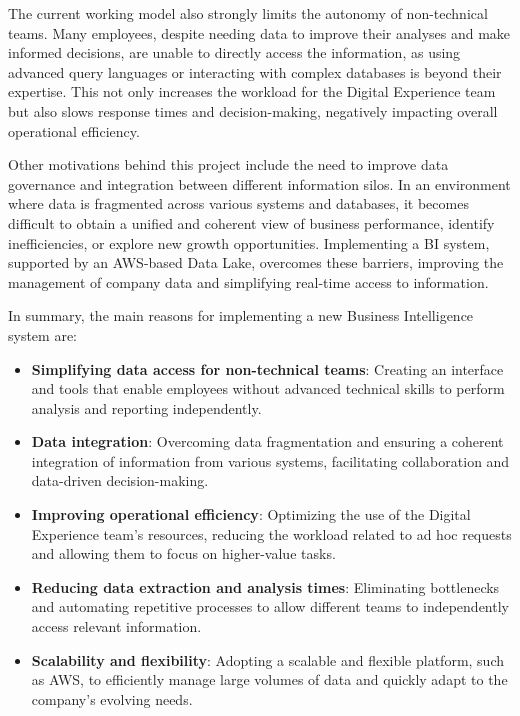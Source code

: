 The current working model also strongly limits the autonomy of non-technical teams. Many employees, despite needing data to improve their analyses and make informed decisions, are unable to directly access the information, as using advanced query languages or interacting with complex databases is beyond their expertise. This not only increases the workload for the Digital Experience team but also slows response times and decision-making, negatively impacting overall operational efficiency.

Other motivations behind this project include the need to improve data governance and integration between different information silos. In an environment where data is fragmented across various systems and databases, it becomes difficult to obtain a unified and coherent view of business performance, identify inefficiencies, or explore new growth opportunities. Implementing a \ac{BI} system, supported by an \ac{AWS}-based Data Lake, overcomes these barriers, improving the management of company data and simplifying real-time access to information.

In summary, the main reasons for implementing a new Business Intelligence system are:

\begin{itemize}
    \item \textbf{Simplifying data access for non-technical teams}: Creating an interface and tools that enable employees without advanced technical skills to perform analysis and reporting independently.
    \item \textbf{Data integration}: Overcoming data fragmentation and ensuring a coherent integration of information from various systems, facilitating collaboration and data-driven decision-making.
    \item \textbf{Improving operational efficiency}: Optimizing the use of the Digital Experience team's resources, reducing the workload related to ad hoc requests and allowing them to focus on higher-value tasks.
    \item \textbf{Reducing data extraction and analysis times}: Eliminating bottlenecks and automating repetitive processes to allow different teams to independently access relevant information.
    \item \textbf{Scalability and flexibility}: Adopting a scalable and flexible platform, such as \ac{AWS}, to efficiently manage large volumes of data and quickly adapt to the company's evolving needs.
\end{itemize}

